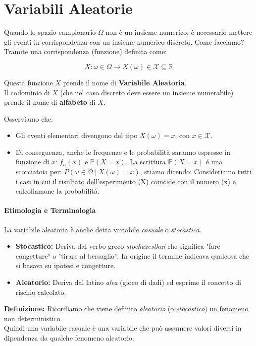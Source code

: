 \section{Variabili Aleatorie}

Quando lo spazio campionario $\Omega$ non è un insieme numerico, è necessario mettere gli eventi in corrispondenza con un insieme numerico discreto. Come facciamo? Tramite una corrispondenza (funzione) definita come:

\[
X: \omega \in \Omega \to X(\omega) \in \mathcal{X} \subseteq \mathbb{R}
\]

Questa funzione $X$ prende il nome di \textbf{Variabile Aleatoria}.
\\Il codominio di $X$ (che nel caso discreto deve essere un insieme numerabile) prende il nome di \textbf{alfabeto} di $X$.

Osserviamo che:
\begin{itemize}
    \item Gli eventi elementari divengono del tipo $X(\omega) = x$, con $x \in \mathcal{X}$.
    \item Di conseguenza, anche le frequenze e le probabilità saranno espresse in funzione di $x$: $f_n(x)$ e $\mathbb{P}(X=x)$. La scrittura $\mathbb{P}(X=x)$ é una scorciatoia per: $P({\omega \in \Omega \mid X(\omega) = x})$, stiamo dicendo: Consideriamo tutti i casi in cui il risultato dell'esperimento (X) coincide con il numero (x) e calcoliamone la probabilitá. 
\end{itemize}

\paragraph{Etimologia e Terminologia}
La variabile aleatoria è anche detta variabile \textit{casuale} o \textit{stocastica}.
\begin{itemize}
    \item \textbf{Stocastico:} Deriva dal verbo greco \textit{stochazesthai} che significa "fare congetture" o "tirare al bersaglio". In origine il termine indicava qualcosa che si basava su ipotesi e congetture.
    \item \textbf{Aleatorio:} Deriva dal latino \textit{alea} (gioco di dadi) ed esprime il concetto di rischio calcolato.
\end{itemize}

\textbf{Definizione:} Ricordiamo che viene definito \textit{aleatorio} (o \textit{stocastico}) un fenomeno non deterministico.
\\Quindi una variabile casuale è una variabile che può assumere valori diversi in dipendenza da qualche fenomeno aleatorio.

